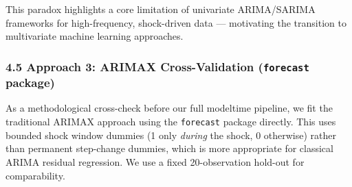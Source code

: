 \documentclass[
]{article}
\begin{document}
This paradox highlights a core limitation of univariate ARIMA/SARIMA
frameworks for high-frequency, shock-driven data --- motivating the
transition to multivariate machine learning approaches.

\subsubsection{\texorpdfstring{4.5 Approach 3: ARIMAX Cross-Validation
(\texttt{forecast}
package)}{4.5 Approach 3: ARIMAX Cross-Validation (forecast package)}}\label{approach-3-arimax-cross-validation-forecast-package}

As a methodological cross-check before our full modeltime pipeline, we
fit the traditional ARIMAX approach using the \texttt{forecast} package
directly. This uses bounded shock window dummies (1 only \emph{during}
the shock, 0 otherwise) rather than permanent step-change dummies, which
is more appropriate for classical ARIMA residual regression. We use a
fixed 20-observation hold-out for comparability.
\end{document}
